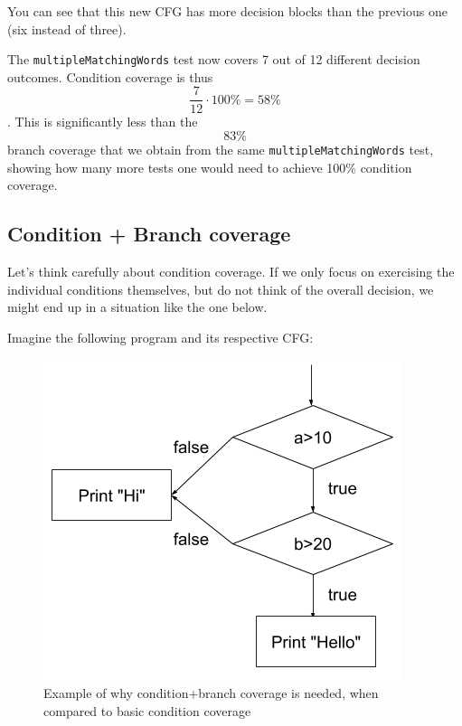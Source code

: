 You can see that this new CFG has more decision blocks than the previous
one (six instead of three).

The \texttt{multipleMatchingWords} test now covers 7 out of 12 different
decision outcomes. Condition coverage is thus
\[\frac{7}{12} \cdot 100\% = 58\%\]. This is significantly less than the
\[83\%\] branch coverage that we obtain from the same
\texttt{multipleMatchingWords} test, showing how many more tests one
would need to achieve 100\% condition coverage.

\hypertarget{condition-branch-coverage}{%
\subsection{Condition + Branch
coverage}\label{condition-branch-coverage}}

Let's think carefully about condition coverage. If we only focus on
exercising the individual conditions themselves, but do not think of the
overall decision, we might end up in a situation like the one below.

Imagine the following program and its respective CFG:

\begin{Shaded}
\begin{Highlighting}[]
 \NormalTok{(}
  \NormalTok{) \{}
    \NormalTok{(}\NormalTok{);}
\NormalTok{  \} }\NormalTok{ \{}
    \NormalTok{(}\NormalTok{);}
\NormalTok{  \}}
\NormalTok{\}}
\end{Highlighting}
\end{Shaded}

\begin{figure}
\centering
\includegraphics{img/structural-testing/examples/cond_plus_branch.png}
\caption{Example of why condition+branch coverage is needed, when
compared to basic condition coverage}
\end{figure}

